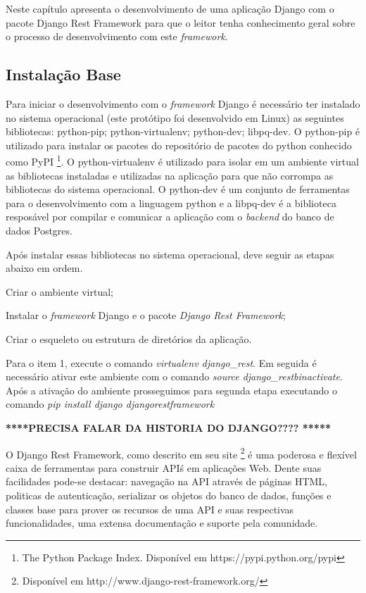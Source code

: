   Neste capítulo apresenta o desenvolvimento de uma aplicação Django com o pacote Django Rest Framework para que o 
  leitor tenha conhecimento geral sobre o processo de desenvolvimento com este \textit{framework}. 
  
  
\subsection{Instalação Base}

  Para iniciar o desenvolvimento com o \textit{framework} Django é necessário ter instalado no sistema operacional
  (este protótipo foi desenvolvido em Linux) as seguintes bibliotecas: python-pip; python-virtualenv; python-dev;
  libpq-dev.  O python-pip é utilizado para instalar os pacotes do repositório de pacotes do python conhecido como
  PyPI \footnote{The Python Package Index. Disponível em https://pypi.python.org/pypi}. O python-virtualenv é utilizado
  para isolar em um ambiente virtual as bibliotecas instaladas e utilizadas na aplicação para que não corrompa as bibliotecas
  do sistema operacional. O python-dev é um conjunto de ferramentas para o desenvolvimento com a linguagem python e a libpq-dev
  é a biblioteca resposável por compilar e comunicar a aplicação com o \textit{backend} do banco de dados Postgres.
  
  Após instalar essas bibliotecas no sistema operacional, deve seguir as etapas abaixo em ordem.
  
  \begin{compactitem}
    \item[1)] Criar o ambiente virtual;
    \item[2)] Instalar o \textit{framework} Django e o pacote \textit{Django Rest Framework};
    \item[3)] Criar o esqueleto ou estrutura de diretórios da aplicação.
  \end{compactitem}
  
  Para o item 1, execute o comando \textit{virtualenv django\_rest}. Em seguida é necessário ativar este ambiente com o comando
  \textit{source django\_rest\/bin\/activate}. Após a ativação do ambiente prosseguimos para segunda etapa executando o comando
  \textit{ pip install django djangorestframework}
  
  \textbf{****PRECISA FALAR DA HISTORIA DO DJANGO???? *****}
  
  O Django Rest Framework, como descrito em seu site \footnote{Disponível em http://www.django-rest-framework.org/} é uma poderosa
  e flexível caixa de ferramentas para construir API\'s em aplicações Web. Dente suas facilidades pode-se destacar: navegação na API através
  de páginas HTML, politicas de autenticação, serializar os objetos do banco de dados, funções e classes base para prover os recursos
  de uma API e suas respectivas funcionalidades, uma extensa documentação e suporte pela comunidade.
  
